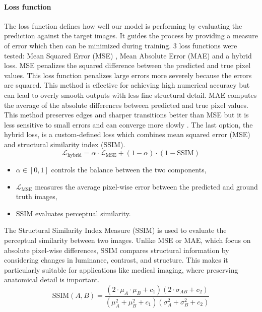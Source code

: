 \documentclass[twocolumn]{article}
\begin{document}
\paragraph{Loss function}\label{loss_function}
The loss function defines how well our model is performing by evaluating the prediction against the target images. 
It guides the process by providing a measure of error which then can be minimized during training. 
3 loss functions were tested: Mean Squared Error (MSE) , Mean Absolute Error (MAE) and a hybrid loss. 
MSE penalizes the squared difference between the predicted and true pixel values. 
This loss function penalizes large errors more severely because the errors are squared. 
This method is effective for achieving high numerical accuracy but can lead to overly smooth outputs with less fine structural detail.
MAE computes the average of the absolute differences between predicted and true pixel values. 
This method preserves edges and sharper transitions better than MSE but it is less sensitive to small errors and can converge more slowly \cite{anderson_2023_loss}.
The last option, the hybrid loss, is a custom-defined loss which combines mean squared error (MSE) and structural similarity index (SSIM).
\begin{equation}\label{eq:3}
\mathcal{L}_{\text{hybrid}} = \alpha \cdot \mathcal{L}_{\text{MSE}} + (1 - \alpha) \cdot (1 - \text{SSIM})
\end{equation}
\begin{itemize}
    \item $\alpha \in [0, 1]$ controls the balance between the two components,
    \item $\mathcal{L}_{\text{MSE}}$ measures the average pixel-wise error between the predicted and ground truth images,
    \item $\text{SSIM}$ evaluates perceptual similarity.
\end{itemize}

The Structural Similarity Index Measure (SSIM) is used to evaluate the perceptual similarity between two images.  
Unlike MSE or MAE, which focus on absolute pixel-wise differences, SSIM compares structural information by considering changes in luminance, contrast, and structure.  
This makes it particularly suitable for applications like medical imaging, where preserving anatomical detail is important.
\begin{equation}\label{eq:SSIM}
\text{SSIM}(A, B) = \frac{(2 \cdot \mu_A \cdot \mu_B + c_1)(2 \cdot \sigma_{AB} + c_2)}{(\mu_A^2 + \mu_B^2 + c_1)(\sigma_A^2 + \sigma_B^2 + c_2)}
\end{equation}
\end{document}
